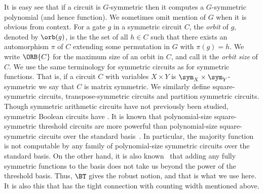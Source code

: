 \documentclass[11pt]{article}
\begin{document}
It is easy see that if a circuit is $G$-symmetric then it computes a
$G$-symmetric polynomial (and hence function). We sometimes omit mention of $G$
when it is obvious from context. For a gate $g$ in a symmetric circuit $C$, the
\emph{orbit} of $g$, denoted by $\orb(g)$, is the the set of all $h \in C$ such
that there exists an automorphism $\pi$ of $C$ extending some permutation in $G$ with $\pi(g) = h$. We write
$\ORB{C}$ for the maximum size of an orbit in $C$, and call it the \emph{orbit
  size} of $C$.
We use the same terminology for symmetric circuits as for symmetric functions.
That is, if a circuit $C$ with variables $X \times Y$ is $\sym_X \times
\sym_Y$-symmetric we say that $C$ is matrix symmetric. We similarly define
square-symmetric circuits, transpose-symmetric circuits and partition symmetric circuits. 
Though symmetric arithmetic circuits have not previously been studied, symmetric
Boolean circuits have \cite{DenenbergGS86,Otto96,AndersonD17,Rossman19}. It is known that
polynomial-size square-symmetric threshold circuits are more powerful than
polynomial-size square-symmetric circuits over the standard basis~\cite{AndersonD17}.
In particular, the majority function is not computable by any family of
polynomial-size symmetric circuits over the standard basis. On the other hand,
it is also known~\cite{DawarW22} that adding any fully symmetric functions to
the basis does not take us beyond the power of the threshold basis. Thus, $\BT$
gives the robust notion, and that is what we use here. It is also this that has
the tight connection with counting width mentioned above.
%
%
%
%
%
%
%
%
%
%
%
%
%
%
%
\end{document}

